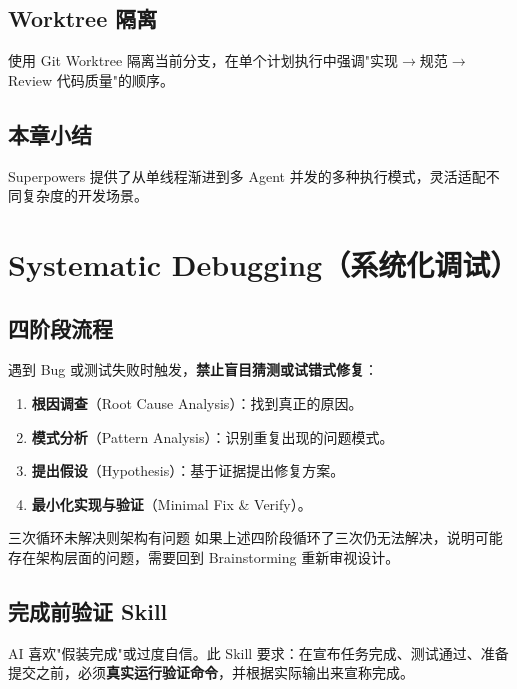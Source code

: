 \documentclass[a4paper]{article}
\begin{document}
\subsection{Worktree 隔离}

使用 Git Worktree 隔离当前分支，在单个计划执行中强调"实现$\rightarrow$规范$\rightarrow$Review 代码质量"的顺序。

\subsection{本章小结}

Superpowers 提供了从单线程渐进到多 Agent 并发的多种执行模式，灵活适配不同复杂度的开发场景。


\section{Systematic Debugging（系统化调试）}

\subsection{四阶段流程}

遇到 Bug 或测试失败时触发，\textbf{禁止盲目猜测或试错式修复}：

\begin{enumerate}
    \item \textbf{根因调查}（Root Cause Analysis）：找到真正的原因。
    \item \textbf{模式分析}（Pattern Analysis）：识别重复出现的问题模式。
    \item \textbf{提出假设}（Hypothesis）：基于证据提出修复方案。
    \item \textbf{最小化实现与验证}（Minimal Fix \& Verify）。
\end{enumerate}

\begin{warningbox}{三次循环未解决则架构有问题}
如果上述四阶段循环了三次仍无法解决，说明可能存在架构层面的问题，需要回到 Brainstorming 重新审视设计。
\end{warningbox}

\subsection{完成前验证 Skill}

AI 喜欢"假装完成"或过度自信。此 Skill 要求：在宣布任务完成、测试通过、准备提交之前，必须\textbf{真实运行验证命令}，并根据实际输出来宣称完成。
\end{document}
